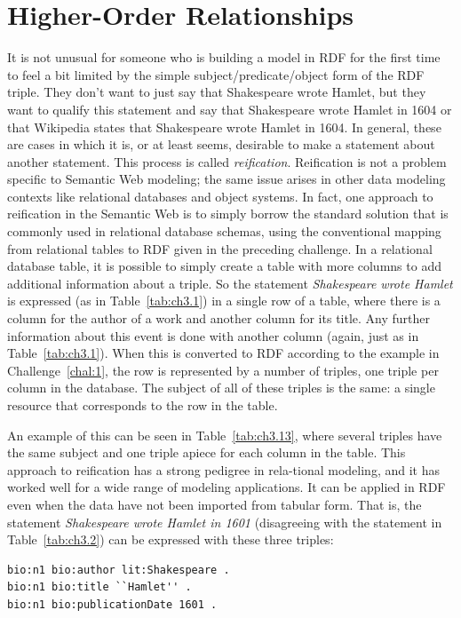 \section{Higher-Order Relationships}

It is not unusual for someone who is building a model in RDF for the
first time to feel a bit limited by the simple subject/predicate/object
form of the RDF triple. They don't want to just say that Shakespeare
wrote Hamlet, but they want to qualify this statement and say that
Shakespeare wrote Hamlet in 1604 or that Wikipedia states that
Shakespeare wrote Hamlet in 1604. In general, these are cases in which
it is, or at least seems, desirable to make a statement about another
statement. This process is called \emph{reification}. Reification is not a
problem specific to Semantic Web modeling; the same issue arises in
other data modeling contexts like relational databases and object
systems. In fact, one approach to reification in the Semantic Web is to
simply borrow the standard solution that is commonly used in relational
database schemas, using the conventional mapping from relational tables
to RDF given in the preceding challenge. In a relational database table,
it is possible to simply create a table with more columns to add
additional information about a triple. So the statement
\emph{Shakespeare wrote Hamlet} is expressed (as in Table~\ref{tab:ch3.1}) in a
single row of a table, where there is a column for the author of a work
and another column for its title. Any further information about this
event is done with another column (again, just as in Table~\ref{tab:ch3.1}). When
this is converted to RDF according to the example in Challenge~\ref{chal:1}, the
row is represented by a number of triples, one triple per column in the
database. The subject of all of these triples is the same: a single
resource that corresponds to the row in the table.

An example of this can be seen in Table~\ref{tab:ch3.13}, where several triples have
the same subject and one triple apiece for each column in the table.
This approach to reification has a strong pedigree in rela-tional
modeling, and it has worked well for a wide range of modeling
applications. It can be applied in RDF even when the data have not been
imported from tabular form. That is, the statement \emph{Shakespeare
wrote Hamlet in 1601} (disagreeing with the statement in Table~\ref{tab:ch3.2}) can
be expressed with these three triples:

\begin{lstlisting}
bio:n1 bio:author lit:Shakespeare . 
bio:n1 bio:title ``Hamlet'' .
bio:n1 bio:publicationDate 1601 .
\end{lstlisting}

